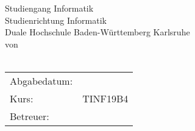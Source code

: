 \begin{titlepage}
	\sffamily
	
	\begin{center}
		\huge{\textsc{\textbf{\theTitle}}}
		\\[2ex]
		\Large{\textbf{\theSubtitle}}
		\\[8ex]
		
		\Large{Studiengang Informatik}
		\\
		\normalsize{Studienrichtung Informatik}
		\\
		\normalsize{Duale Hochschule Baden-Württemberg Karlsruhe}
		\\[6ex]
		
		von
		\\
		\theAuthor
		\\[15ex]
		
		\begin{tabular}{ll}
			Abgabedatum:		& \quad \deadline \\
			Kurs:				& \quad TINF19B4 \\ 
			Betreuer:			& \quad \supervisor \\
		\end{tabular}
	\end{center}
\end{titlepage}